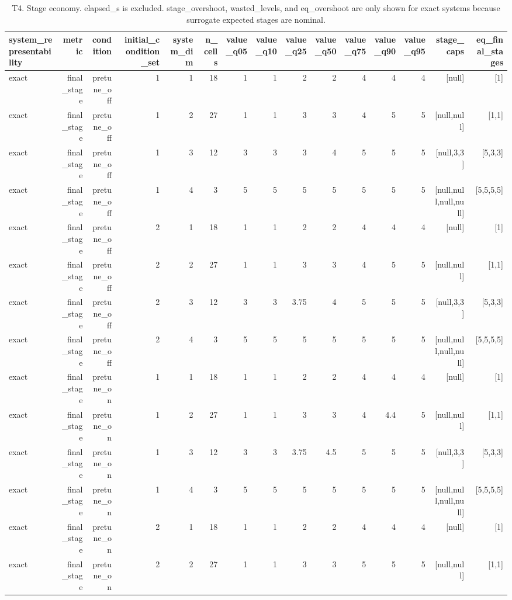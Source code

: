 \begin{table}[htbp]
\centering
\caption{T4. Stage economy. elapsed\_s is excluded. stage\_overshoot, wasted\_levels, and eq\_overshoot are only shown for exact systems because surrogate expected stages are nominal.}
\begin{tabular}{lrrrrrrrrrrrrrr}
\toprule
system\_representability & metric & condition & initial\_condition\_set & system\_dim & n\_cells & value\_q05 & value\_q10 & value\_q25 & value\_q50 & value\_q75 & value\_q90 & value\_q95 & stage\_caps & eq\_final\_stages \\
\midrule
exact & final\_stage & pretune\_off & 1 & 1 & 18 & 1 & 1 & 2 & 2 & 4 & 4 & 4 & [null] & [1] \\
exact & final\_stage & pretune\_off & 1 & 2 & 27 & 1 & 1 & 3 & 3 & 4 & 5 & 5 & [null,null] & [1,1] \\
exact & final\_stage & pretune\_off & 1 & 3 & 12 & 3 & 3 & 3 & 4 & 5 & 5 & 5 & [null,3,3] & [5,3,3] \\
exact & final\_stage & pretune\_off & 1 & 4 & 3 & 5 & 5 & 5 & 5 & 5 & 5 & 5 & [null,null,null,null] & [5,5,5,5] \\
exact & final\_stage & pretune\_off & 2 & 1 & 18 & 1 & 1 & 2 & 2 & 4 & 4 & 4 & [null] & [1] \\
exact & final\_stage & pretune\_off & 2 & 2 & 27 & 1 & 1 & 3 & 3 & 4 & 5 & 5 & [null,null] & [1,1] \\
exact & final\_stage & pretune\_off & 2 & 3 & 12 & 3 & 3 & 3.75 & 4 & 5 & 5 & 5 & [null,3,3] & [5,3,3] \\
exact & final\_stage & pretune\_off & 2 & 4 & 3 & 5 & 5 & 5 & 5 & 5 & 5 & 5 & [null,null,null,null] & [5,5,5,5] \\
exact & final\_stage & pretune\_on & 1 & 1 & 18 & 1 & 1 & 2 & 2 & 4 & 4 & 4 & [null] & [1] \\
exact & final\_stage & pretune\_on & 1 & 2 & 27 & 1 & 1 & 3 & 3 & 4 & 4.4 & 5 & [null,null] & [1,1] \\
exact & final\_stage & pretune\_on & 1 & 3 & 12 & 3 & 3 & 3.75 & 4.5 & 5 & 5 & 5 & [null,3,3] & [5,3,3] \\
exact & final\_stage & pretune\_on & 1 & 4 & 3 & 5 & 5 & 5 & 5 & 5 & 5 & 5 & [null,null,null,null] & [5,5,5,5] \\
exact & final\_stage & pretune\_on & 2 & 1 & 18 & 1 & 1 & 2 & 2 & 4 & 4 & 4 & [null] & [1] \\
exact & final\_stage & pretune\_on & 2 & 2 & 27 & 1 & 1 & 3 & 3 & 5 & 5 & 5 & [null,null] & [1,1] \\

\end{tabular}
\end{table}
